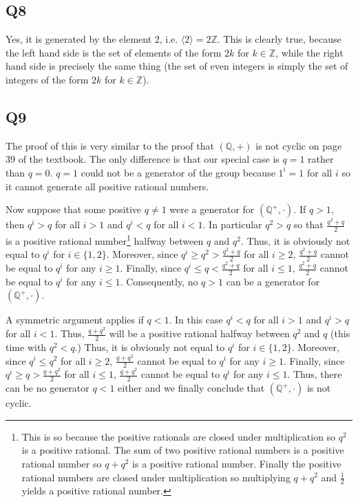 \documentclass[12pt]{article}
\def\Q{{\mathbb Q}}        %
\def\Z{{\mathbb Z}}        %
\numberwithin{theorem}{section}
\numberwithin{equation}{section}
\numberwithin{remark}{section}
\numberwithin{definition}{section}
\numberwithin{theorem}{section}
\numberwithin{lemma}{section}
\numberwithin{example}{section}
\begin{document}
\subsection{Q8}

Yes, it is generated by the element $2$, i.e. $\langle 2 \rangle = 2\Z$. This is clearly true, because the left hand side is the set of elements of the form $2k$ for $k\in\Z$, while the right hand side is precisely the same thing (the set of even integers is simply the set of integers of the form $2k$ for $k\in\Z$). 



\subsection{Q9}

The proof of this is very similar to the proof that $(\Q,+)$ is not cyclic on page 39 of the textbook. The only difference is that our special case is $q=1$ rather than $q=0$. $q=1$ could not be a generator of the group because $1^i=1$ for all $i$ so it cannot generate all positive rational numbers. 

Now suppose that some positive $q\neq1$ were a generator for $(\Q^+,\cdot)$. If $q>1$, then $q^i > q$ for all $i>1$ and $q^i < q$ for all $i<1$. In particular $q^2 > q$ so that $\frac{q^2+q}{2}$ is a positive rational number\footnote{This is so because the positive rationals are closed under multiplication so $q^2$ is a positive rational. The sum of two positive rational numbers is a positive rational number so $q+q^2$ is a positive rational number. Finally the positive rational numbers are closed under multiplication so multiplying $q+q^2$ and $\frac{1}{2}$ yields a positive rational number.} halfway between $q$ and $q^2$. Thus, it is obviously not equal to $q^i$ for $i\in\{1,2\}$. Moreover, since $q^i\ge q^2>\frac{q^2+q}{2}$ for all $i\ge 2$, $\frac{q^2+q}{2}$ cannot be equal to $q^i$ for any $i\ge 1$. Finally, since $q^i \le q < \frac{q^2+q}{2}$ for all $i\le 1$, $\frac{q^2+q}{2}$ cannot be equal to $q^i$ for any $i\le 1$. Consequently, no $q>1$ can be a generator for $(\Q^+,\cdot)$.

A symmetric argument applies if $q < 1$. In this case $q^i < q$ for all $i>1$ and $q^i > q$ for all $i<1$. Thus, $\frac{q+q^2}{2}$ will be a positive rational halfway between $q^2$ and $q$ (this time with $q^2<q$.) Thus, it is obviously not equal to $q^i$ for $i\in\{1,2\}$. Moreover, since $q^i \le q^2$ for all $i\ge 2$, $\frac{q+q^2}{2}$ cannot be equal to $q^i$ for any $i\ge 1$. Finally, since $q^i \ge q > \frac{q+q^2}{2}$ for all $i\le 1$, $\frac{q+q^2}{2}$ cannot be equal to $q^i$ for any $i\le 1$. Thus, there can be no generator $q<1$ either and we finally conclude that $(\Q^+,\cdot)$ is not cyclic. 
\end{document}
